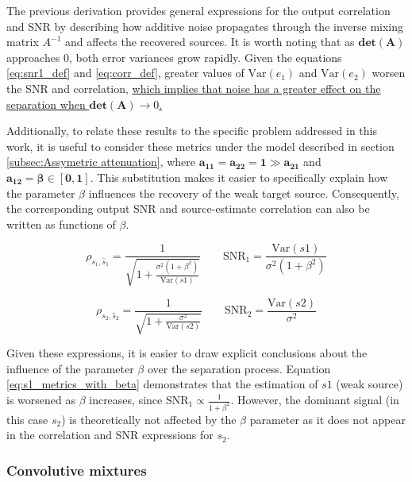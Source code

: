 The previous derivation provides general expressions for the output correlation and SNR by describing how additive noise propagates through the inverse mixing matrix $A^{-1}$ and affects the recovered sources. It is worth noting that as $\mathbf{det(A)}$ approaches 0, both error variances grow rapidly. Given the equations \ref{eq:snr1_def} and \ref{eq:corr_def}, greater values of $\mathrm{Var}(e_1)$ and  $\mathrm{Var}(e_2)$ worsen the SNR and correlation, \uline{ which implies that noise has a greater effect on the separation when $\mathbf{det(A)}\rightarrow 0$. }

Additionally, to relate these results to the specific problem addressed in this work, it is useful to consider these metrics under the model described in section \ref{subsec:Assymetric attenuation}, where $\mathbf{a_{11}=a_{22}=1 \gg a_{21}}$ and $\mathbf{a_{12}=\beta \in[0,1]}$. This substitution makes it easier to specifically explain how the parameter $\beta$ influences the recovery of the weak target source. Consequently, the corresponding output SNR and source-estimate correlation can also be written as functions of $\beta$.

\begin{equation}
\rho_{s_1,\hat{s}_1}
 = \frac{1}{\sqrt{1+\frac{\sigma^2 (1+\beta^2)}{\mathrm{Var}(s1)}}}
 \qquad
 \mathrm{SNR}_1=\frac{\mathrm{Var}(s1)}{\sigma^2 (1+\beta^2)}
\label{eq:s1_metrics_with_beta}
\end{equation}

\begin{equation}
\rho_{s_2,\hat{s}_2}
 = \frac{1}{\sqrt{1+\frac{\sigma^2}{\mathrm{Var}(s2)}}}
 \qquad
 \mathrm{SNR}_2=\frac{\mathrm{Var}(s2)}{\sigma^2}
\label{eq:s2_metrics_with_beta}
\end{equation}

Given these expressions, it is easier to draw explicit conclusions about the influence of the parameter $\beta$ over the separation process. Equation \ref{eq:s1_metrics_with_beta} demonstrates that the estimation of $s1$ (weak source) is worsened as $\beta$ increases, since $\mathrm{SNR}_1 \propto \frac{1}{1+\beta^2}$. However, the dominant signal (in this case $s_2$) is theoretically not affected by the $\beta$ parameter as it does not appear in the correlation and SNR expressions for $s_2$.

\subsubsection{Convolutive mixtures}

